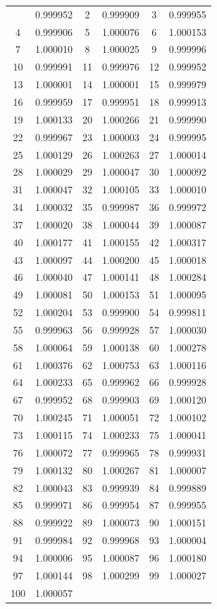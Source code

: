 \documentclass[12pt]{article}
\begin{document}
\begin{longtable}{@{}cc|cc|cc@{}}
\bottomrule
\endlastfoot
1 & 0.999952 & 2 & 0.999909 & 3 & 0.999955 \\
4 & 0.999906 & 5 & 1.000076 & 6 & 1.000153 \\
7 & 1.000010 & 8 & 1.000025 & 9 & 0.999996 \\
10 & 0.999991 & 11 & 0.999976 & 12 & 0.999952 \\
13 & 1.000001 & 14 & 1.000001 & 15 & 0.999979 \\
16 & 0.999959 & 17 & 0.999951 & 18 & 0.999913 \\
19 & 1.000133 & 20 & 1.000266 & 21 & 0.999990 \\
22 & 0.999967 & 23 & 1.000003 & 24 & 0.999995 \\
25 & 1.000129 & 26 & 1.000263 & 27 & 1.000014 \\
28 & 1.000029 & 29 & 1.000047 & 30 & 1.000092 \\
31 & 1.000047 & 32 & 1.000105 & 33 & 1.000010 \\
34 & 1.000032 & 35 & 0.999987 & 36 & 0.999972 \\
37 & 1.000020 & 38 & 1.000044 & 39 & 1.000087 \\
40 & 1.000177 & 41 & 1.000155 & 42 & 1.000317 \\
43 & 1.000097 & 44 & 1.000200 & 45 & 1.000018 \\
46 & 1.000040 & 47 & 1.000141 & 48 & 1.000284 \\
49 & 1.000081 & 50 & 1.000153 & 51 & 1.000095 \\
52 & 1.000204 & 53 & 0.999900 & 54 & 0.999811 \\
55 & 0.999963 & 56 & 0.999928 & 57 & 1.000030 \\
58 & 1.000064 & 59 & 1.000138 & 60 & 1.000278 \\
61 & 1.000376 & 62 & 1.000753 & 63 & 1.000116 \\
64 & 1.000233 & 65 & 0.999962 & 66 & 0.999928 \\
67 & 0.999952 & 68 & 0.999903 & 69 & 1.000120 \\
70 & 1.000245 & 71 & 1.000051 & 72 & 1.000102 \\
73 & 1.000115 & 74 & 1.000233 & 75 & 1.000041 \\
76 & 1.000072 & 77 & 0.999965 & 78 & 0.999931 \\
79 & 1.000132 & 80 & 1.000267 & 81 & 1.000007 \\
82 & 1.000043 & 83 & 0.999939 & 84 & 0.999889 \\
85 & 0.999971 & 86 & 0.999954 & 87 & 0.999955 \\
88 & 0.999922 & 89 & 1.000073 & 90 & 1.000151 \\
91 & 0.999984 & 92 & 0.999968 & 93 & 1.000004 \\
94 & 1.000006 & 95 & 1.000087 & 96 & 1.000180 \\
97 & 1.000144 & 98 & 1.000299 & 99 & 1.000027 \\
100 & 1.000057 &  &  &  &  \\

\end{longtable}
\end{document}
